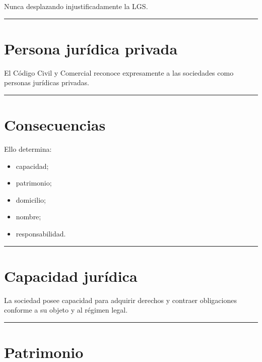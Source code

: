 \documentclass[
  spanish,
  letterpaper,
  DIV=11,
  numbers=noendperiod]{scrartcl}
\providecommand{\tightlist}{%
  \setlength{\itemsep}{0pt}\setlength{\parskip}{0pt}}
\begin{document}
Nunca desplazando injustificadamente la LGS.

\begin{center}\rule{0.5\linewidth}{0.5pt}\end{center}

\section{Persona jurídica privada}\label{persona-juruxeddica-privada}

El Código Civil y Comercial reconoce expresamente a las sociedades como
personas jurídicas privadas.

\begin{center}\rule{0.5\linewidth}{0.5pt}\end{center}

\section{Consecuencias}\label{consecuencias-1}

Ello determina:

\begin{itemize}
\tightlist
\item
  capacidad;
\item
  patrimonio;
\item
  domicilio;
\item
  nombre;
\item
  responsabilidad.
\end{itemize}

\begin{center}\rule{0.5\linewidth}{0.5pt}\end{center}

\section{Capacidad jurídica}\label{capacidad-juruxeddica}

La sociedad posee capacidad para adquirir derechos y contraer
obligaciones conforme a su objeto y al régimen legal.

\begin{center}\rule{0.5\linewidth}{0.5pt}\end{center}

\section{Patrimonio}\label{patrimonio}
\end{document}
